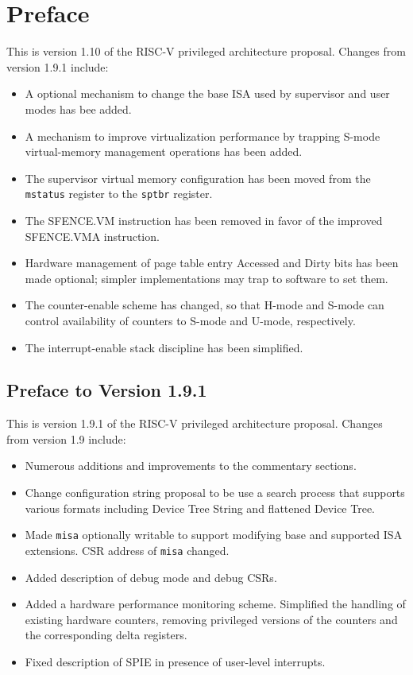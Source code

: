 \chapter{Preface}

This is version 1.10 of the RISC-V privileged architecture
proposal.  Changes from version 1.9.1 include:

\begin{itemize}
  \parskip 0pt
  \itemsep 1pt
\item A optional mechanism to change the base ISA used by supervisor and user
      modes has bee added.
\item A mechanism to improve virtualization performance by
      trapping S-mode virtual-memory management operations has been added.
\item The supervisor virtual memory configuration has been moved from the
      {\tt mstatus} register to the {\tt sptbr} register.
\item The SFENCE.VM instruction has been removed in favor of the improved
      SFENCE.VMA instruction.
\item Hardware management of page table entry Accessed and Dirty bits has
      been made optional; simpler implementations may trap to software to
      set them.
\item The counter-enable scheme has changed, so that H-mode and S-mode can
      control availability of counters to S-mode and U-mode, respectively.
\item The interrupt-enable stack discipline has been simplified.
\end{itemize}

\section*{Preface to Version 1.9.1}

This is version 1.9.1 of the RISC-V privileged architecture
proposal.  Changes from version 1.9 include:

\begin{itemize}
  \parskip 0pt
  \itemsep 1pt
\item Numerous additions and improvements to the commentary sections.
\item Change configuration string proposal to be use a search process
  that supports various formats including Device Tree String and
  flattened Device Tree.
\item Made {\tt misa} optionally writable to support modifying base
  and supported ISA extensions.  CSR address of {\tt misa} changed.
\item Added description of debug mode and debug CSRs.
\item Added a hardware performance monitoring scheme.  Simplified the
  handling of existing hardware counters, removing privileged versions
  of the counters and the corresponding delta registers.
\item Fixed description of SPIE in presence of user-level interrupts.
\end{itemize}
